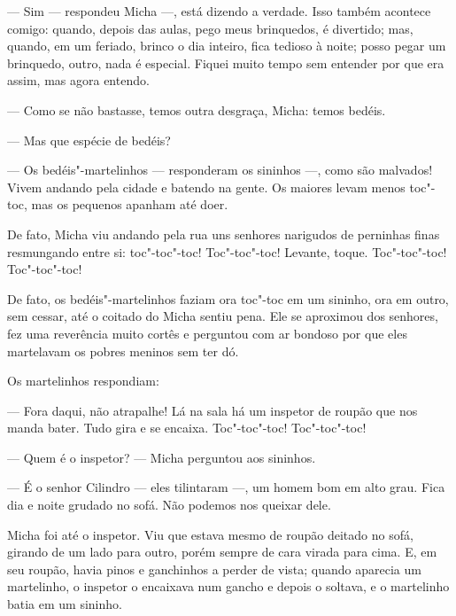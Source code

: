 --- Sim --- respondeu Micha ---, está dizendo a verdade. Isso também
acontece comigo: quando, depois das aulas, pego meus brinquedos, é
divertido; mas, quando, em um feriado, brinco o dia inteiro, fica
tedioso à noite; posso pegar um brinquedo, outro, nada é especial.
Fiquei muito tempo sem entender por que era assim, mas agora entendo.

--- Como se não bastasse, temos outra desgraça, Micha: temos bedéis.

--- Mas que espécie de bedéis?

--- Os bedéis"-martelinhos --- responderam os sininhos ---, como são
malvados! Vivem andando pela cidade e batendo na gente. Os maiores levam
menos toc"-toc, mas os pequenos apanham até doer.

De fato, Micha viu andando pela rua uns senhores narigudos de perninhas
finas resmungando entre si: toc"-toc"-toc! Toc"-toc"-toc! Levante, toque.
Toc"-toc"-toc! Toc"-toc"-toc!

De fato, os bedéis"-martelinhos faziam ora toc"-toc em um sininho, ora em
outro, sem cessar, até o coitado do Micha sentiu pena. Ele se aproximou
dos senhores, fez uma reverência muito cortês e perguntou com ar bondoso
por que eles martelavam os pobres meninos sem ter dó.

Os martelinhos respondiam:

--- Fora daqui, não atrapalhe! Lá na sala há um inspetor de roupão que
nos manda bater. Tudo gira e se encaixa. Toc"-toc"-toc! Toc"-toc"-toc!

--- Quem é o inspetor? --- Micha perguntou aos sininhos.

--- É o senhor Cilindro --- eles tilintaram ---, um homem bom em alto
grau. Fica dia e noite grudado no sofá. Não podemos nos queixar dele.

Micha foi até o inspetor. Viu que estava mesmo de roupão deitado no
sofá, girando de um lado para outro, porém sempre de cara virada para
cima. E, em seu roupão, havia pinos e ganchinhos a perder de vista;
quando aparecia um martelinho, o inspetor o encaixava num gancho e
depois o soltava, e o martelinho batia em um sininho.

